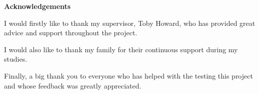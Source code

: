 \vspace*{\fill}

\begin{center}
    \textbf{Acknowledgements}   
\end{center}

I would firstly like to thank my supervisor, Toby Howard, who has provided great advice and support throughout the project. 

I would also like to thank my family for their continuous support during my studies.

Finally, a big thank you to everyone who has helped with the testing this project and whose feedback was greatly appreciated.

\vspace*{\fill}